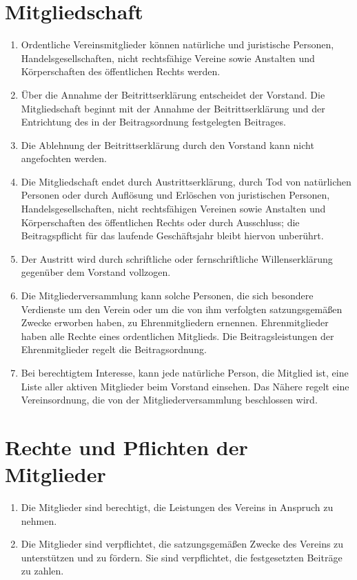 \documentclass[a4paper]{article}
\begin{document}
\section{Mitgliedschaft}
\begin{enumerate}
	\item Ordentliche Vereinsmitglieder können natürliche und juristische Personen, Handelsgesellschaften, nicht rechtsfähige Vereine sowie Anstalten und Körperschaften des öffentlichen Rechts werden.
	\item Über die Annahme der Beitrittserklärung entscheidet der Vorstand. Die Mitgliedschaft beginnt mit der Annahme der Beitrittserklärung und der Entrichtung des in der Beitragsordnung festgelegten Beitrages.
	\item Die Ablehnung der Beitrittserklärung durch den Vorstand kann nicht angefochten werden.
	\item Die Mitgliedschaft endet durch Austrittserklärung, durch Tod von natürlichen Personen oder durch Auflösung und Erlöschen von juristischen Personen, Handelsgesellschaften, nicht rechtsfähigen Vereinen sowie Anstalten und Körperschaften des öffentlichen Rechts oder durch Ausschluss; die Beitragspflicht für das laufende Geschäftsjahr bleibt hiervon unberührt.
	\item Der Austritt wird durch schriftliche oder fernschriftliche Willenserklärung gegenüber dem Vorstand vollzogen.
	\item Die Mitgliederversammlung kann solche Personen, die sich besondere Verdienste um den Verein oder um die von ihm verfolgten satzungsgemäßen Zwecke erworben haben, zu Ehrenmitgliedern ernennen. Ehrenmitglieder haben alle Rechte eines ordentlichen Mitglieds. Die Beitragsleistungen der Ehrenmitglieder regelt die Beitragsordnung.
	\item Bei berechtigtem Interesse, kann jede natürliche Person, die Mitglied ist, eine Liste aller aktiven Mitglieder beim Vorstand einsehen. Das Nähere regelt eine Vereinsordnung, die von der Mitgliederversammlung beschlossen wird.
\end{enumerate}

\section{Rechte und Pflichten der Mitglieder}
\begin{enumerate}
	\item Die Mitglieder sind berechtigt, die Leistungen des Vereins in Anspruch zu nehmen.
	\item Die Mitglieder sind verpflichtet, die satzungsgemäßen Zwecke des Vereins zu unterstützen und zu fördern. Sie sind verpflichtet, die festgesetzten Beiträge zu zahlen.
\end{enumerate}
\end{document}
